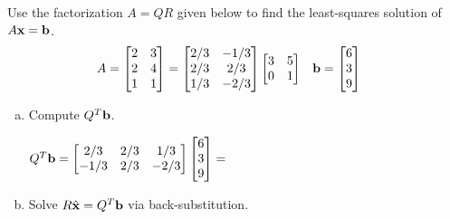 \begin{exercise} %
	Use the factorization $A=QR$ given below to find the least-squares solution of $A\boldsymbol{\mathbf{x}}=\boldsymbol{\mathbf{b}}$.
	\begin{align*}
	A &= \begin{bmatrix}2&3\\2&4\\1&1\end{bmatrix} =
	\begin{bmatrix}2/3&-1/3\\2/3&2/3\\1/3&-2/3\end{bmatrix}
	\begin{bmatrix}3&5\\0&1\end{bmatrix} &
	\boldsymbol{\mathbf{b}} &= \begin{bmatrix}6\\3\\9\end{bmatrix}
	\end{align*}
	\begin{enumerate}[(a)]
		\item Compute $Q^T\boldsymbol{\mathbf{b}}$. \par
		$ Q^T\boldsymbol{\mathbf{b}}= \begin{bmatrix}2/3&2/3&1/3\\-1/3&2/3&-2/3\end{bmatrix}
		\begin{bmatrix}6\\3\\9\end{bmatrix} = $
		\vspace{2em}
		\item Solve $R\hat{\boldsymbol{\mathbf{x}}}=Q^T\boldsymbol{\mathbf{b}}$ via back-substitution.
		\vspace{1in}
	\end{enumerate}
\end{exercise}


\newpage
